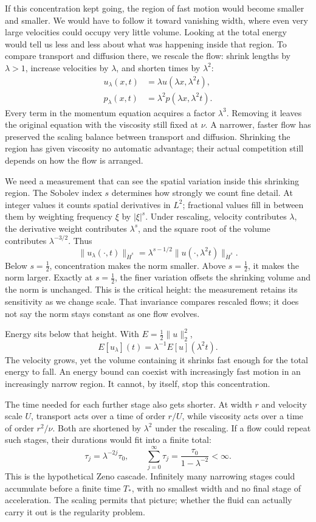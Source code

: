 If this concentration kept going, the region of fast motion would become
smaller and smaller. We would have to follow it toward vanishing width,
where even very large velocities could occupy very little volume. Looking
at the total energy would tell us less and less about what was happening
inside that region. To compare transport and diffusion there, we rescale
the flow: shrink lengths by \(\lambda>1\), increase velocities by
\(\lambda\), and shorten times by \(\lambda^2\):
\[
 \begin{aligned}
 u_\lambda(x,t)&=\lambda u(\lambda x,\lambda^2t),\\
 p_\lambda(x,t)&=\lambda^2p(\lambda x,\lambda^2t).
 \end{aligned}
\]
Every term in the momentum equation acquires a factor \(\lambda^3\).
Removing it leaves the original equation with the viscosity still fixed
at \(\nu\). A narrower, faster flow has preserved the scaling balance
between transport and diffusion. Shrinking the region has given viscosity
no automatic advantage; their actual competition still depends on how the
flow is arranged.

We need a measurement that can see the spatial variation inside this
shrinking region. The Sobolev index \(s\) determines how strongly we count
fine detail. At integer values it counts spatial derivatives in \(L^2\);
fractional values fill in between them by weighting frequency \(\xi\) by
\(|\xi|^s\). Under rescaling, velocity contributes \(\lambda\), the
derivative weight contributes \(\lambda^s\), and the square root of the
volume contributes \(\lambda^{-3/2}\). Thus
\[
 \|u_\lambda(\cdot,t)\|_{\dot H^s}
 =\lambda^{s-1/2}\|u(\cdot,\lambda^2t)\|_{\dot H^s}.
\]
Below \(s=\tfrac12\), concentration makes the norm smaller. Above
\(s=\tfrac12\), it makes the norm larger. Exactly at \(s=\tfrac12\),
the finer variation offsets the shrinking volume and the norm is unchanged.
This is the critical height: the measurement retains its sensitivity as
we change scale. That invariance compares rescaled flows; it does not say
the norm stays constant as one flow evolves.

Energy sits below that height. With \(E=\tfrac12\|u\|_2^2\),
\[
 E[u_\lambda](t)=\lambda^{-1}E[u](\lambda^2t).
\]
The velocity grows, yet the volume containing it shrinks fast enough for
the total energy to fall. An energy bound can coexist with increasingly
fast motion in an increasingly narrow region. It cannot, by itself, stop
this concentration.

The time needed for each further stage also gets shorter. At width \(r\)
and velocity scale \(U\), transport acts over a time of order \(r/U\),
while viscosity acts over a time of order \(r^2/\nu\). Both are shortened
by \(\lambda^2\) under the rescaling. If a flow could repeat such stages,
their durations would fit into a finite total:
\[
 \tau_j=\lambda^{-2j}\tau_0,
 \qquad
 \sum_{j=0}^{\infty}\tau_j
 =\frac{\tau_0}{1-\lambda^{-2}}<\infty.
\]
This is the hypothetical Zeno cascade. Infinitely many narrowing stages
could accumulate before a finite time \(T_*\), with no smallest width
and no final stage of acceleration. The scaling permits that picture;
whether the fluid can actually carry it out is the regularity problem.

